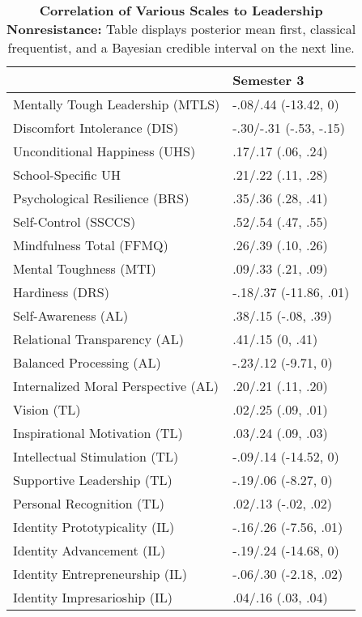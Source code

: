 \begin{table}[ht]
\centering
\begin{tabular}{ll}
  \hline
 & Semester 3 \\ 
  \hline
Mentally Tough Leadership (MTLS) & -.08/.44 (-13.42, 0) \\ 
  Discomfort Intolerance (DIS) & -.30/-.31 (-.53, -.15) \\ 
  Unconditional Happiness (UHS) & .17/.17 (.06, .24) \\ 
  School-Specific UH & .21/.22 (.11, .28) \\ 
  Psychological Resilience (BRS) & .35/.36 (.28, .41) \\ 
  Self-Control (SSCCS) & .52/.54 (.47, .55) \\ 
  Mindfulness Total (FFMQ) & .26/.39 (.10, .26) \\ 
  Mental Toughness (MTI) & .09/.33 (.21, .09) \\ 
  Hardiness (DRS) & -.18/.37 (-11.86, .01) \\ 
  Self-Awareness (AL) & .38/.15 (-.08, .39) \\ 
  Relational Transparency (AL) & .41/.15 (0, .41) \\ 
  Balanced Processing (AL) & -.23/.12 (-9.71, 0) \\ 
  Internalized Moral Perspective (AL) & .20/.21 (.11, .20) \\ 
  Vision (TL) & .02/.25 (.09, .01) \\ 
  Inspirational Motivation (TL) & .03/.24 (.09, .03) \\ 
  Intellectual Stimulation (TL) & -.09/.14 (-14.52, 0) \\ 
  Supportive Leadership (TL) & -.19/.06 (-8.27, 0) \\ 
  Personal Recognition (TL) & .02/.13 (-.02, .02) \\ 
  Identity Prototypicality (IL) & -.16/.26 (-7.56, .01) \\ 
  Identity Advancement (IL) & -.19/.24 (-14.68, 0) \\ 
  Identity Entrepreneurship (IL) & -.06/.30 (-2.18, .02) \\ 
  Identity Impresarioship (IL) & .04/.16 (.03, .04) \\ 
   \hline
\end{tabular}
\caption{\textbf{Correlation of Various Scales to Leadership Nonresistance:} Table displays posterior mean first, classical frequentist, and a Bayesian credible interval on the next line.} 
\label{tab:lnr_corr}
\end{table}
